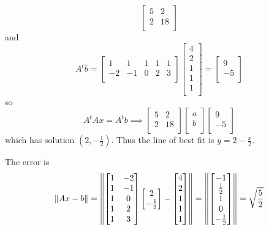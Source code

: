 \documentclass{article}
\begin{document}
\begin{example}
\[\begin{bmatrix}
      5 & 2  \\
      2 & 18 \\
    \end{bmatrix}
  \] and \[
    A^tb =
    \begin{bmatrix}
      1  & 1  & 1 & 1 & 1 \\
      -2 & -1 & 0 & 2 & 3 \\
    \end{bmatrix}
    \begin{bmatrix}
      4 \\2\\1\\1\\1\\
    \end{bmatrix} =
    \begin{bmatrix}
      9 \\-5\\
    \end{bmatrix}
  \] so \[
    A^tAx = A^tb \implies
    \begin{bmatrix}
      5 & 2  \\
      2 & 18 \\
    \end{bmatrix}
    \begin{bmatrix}
      a \\b\\
    \end{bmatrix}
    \begin{bmatrix}
      9 \\-5\\
    \end{bmatrix}
  \] which has solution $(2, -\frac{1}{2})$. Thus the line of best fit is $y = 2 - \frac{x}{2}$.

  The error is \[
    \norm{Ax - b} = \norm{
      \begin{bmatrix}
        1 & -2 \\
        1 & -1 \\
        1 & 0  \\
        1 & 2  \\
        1 & 3  \\
      \end{bmatrix}
      \begin{bmatrix}
        2 \\-\frac{1}{2}\\
      \end{bmatrix} -
      \begin{bmatrix}
        4 \\2\\1\\1\\1\\
      \end{bmatrix}} = \norm{
      \begin{bmatrix}
        -1 \\\frac{1}{2}\\1\\0\\-\frac{1}{2}\\
      \end{bmatrix}} = \sqrt{\frac{5}{2}}
  \]
\end{example}
\end{document}
